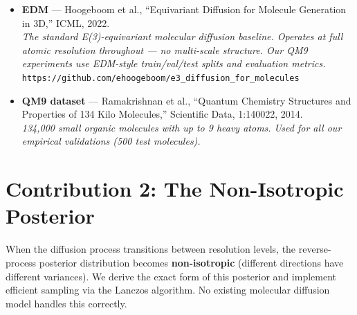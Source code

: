 \documentclass[12pt,a4paper]{article}
\begin{document}
\begin{itemize}[leftmargin=*, itemsep=3pt]
  \item \textbf{EDM} --- Hoogeboom et al., ``Equivariant Diffusion for Molecule Generation in 3D,'' ICML, 2022. \\
    \textit{The standard E(3)-equivariant molecular diffusion baseline. Operates at full atomic resolution throughout --- no multi-scale structure. Our QM9 experiments use EDM-style train/val/test splits and evaluation metrics.}
    \\\texttt{https://github.com/ehoogeboom/e3\_diffusion\_for\_molecules}

  \item \textbf{QM9 dataset} --- Ramakrishnan et al., ``Quantum Chemistry Structures and Properties of 134 Kilo Molecules,'' Scientific Data, 1:140022, 2014. \\
    \textit{134,000 small organic molecules with up to 9 heavy atoms. Used for all our empirical validations (500 test molecules).}
\end{itemize}


\section{Contribution 2: The Non-Isotropic Posterior}

\begin{noveltybox}
When the diffusion process transitions between resolution levels, the reverse-process posterior distribution becomes \textbf{non-isotropic} (different directions have different variances). We derive the exact form of this posterior and implement efficient sampling via the Lanczos algorithm. No existing molecular diffusion model handles this correctly.
\end{noveltybox}

\end{document}
